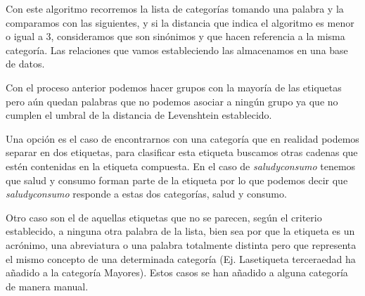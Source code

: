 Con este algoritmo recorremos la lista de categorías tomando una palabra y la comparamos con las siguientes, y si la distancia que indica el algoritmo es menor o igual a 3, consideramos que son sinónimos y que hacen referencia a la misma categoría. Las relaciones que vamos estableciendo las almacenamos en una base de datos.
	

Con el proceso anterior podemos hacer grupos con la mayoría de las etiquetas pero aún quedan palabras que no podemos asociar a ningún grupo ya que no cumplen el umbral de la distancia de Levenshtein establecido.

Una opción es el caso de encontrarnos con una categoría que en realidad podemos separar en dos etiquetas, para clasificar esta etiqueta buscamos otras cadenas que estén contenidas en la etiqueta compuesta. En el caso de \textit{saludyconsumo} tenemos que salud y consumo forman parte de la etiqueta por lo que podemos decir que \textit{saludyconsumo} responde a estas dos categorías, salud y consumo.

Otro caso son el de aquellas etiquetas que no se parecen, según el criterio establecido, a ninguna otra palabra de la lista, bien sea por que la etiqueta es un acrónimo, una abreviatura o una palabra totalmente distinta pero que representa el mismo concepto de una determinada categoría (Ej. Lasetiqueta terceraedad ha añadido a la categoría Mayores). Estos casos se han añadido a alguna categoría de manera manual.

